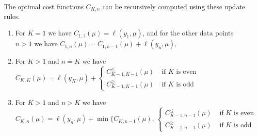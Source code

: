 \documentclass[twoside,11pt]{article}
\begin{document}
\begin{theorem}
\label{thm:gpdpa}
  The optimal cost functions $C_{K,n}$ can be recursively computed
  using these update rules.
\begin{enumerate}
\item For $K=1$ we have
$C_{1,1}(\mu)=\ell(y_1,\mu)$, and for the other data
  points $n>1$ we have
$
C_{1,n}(\mu)=C_{1,n-1}(\mu)+\ell(y_n,\mu),
$
\item For $K>1$ and $n=K$ we have
$
  C_{K,K}(\mu)=\ell(y_K, \mu)+
  \begin{cases}
    C_{K-1,K-1}^\leq(\mu) & \text{ if $K$ is even}\\
    C_{K-1,K-1}^\geq(\mu) & \text{ if $K$ is odd} 
  \end{cases}
$
\item For $K>1$ and $n>K$ we have
 $$
  C_{K,n}(\mu)=\ell(y_n,\mu)+\min\{
C_{K,n-1}(\mu),\,
  \begin{cases}
C_{K-1,n-1}^\leq(\mu)
   & \text{ if $K$ is even}\\
  C_{K-1,n-1}^\geq(\mu)
   & \text{ if $K$ is odd}
  \end{cases}
$$
\end{enumerate}
\end{theorem}
\end{document}
